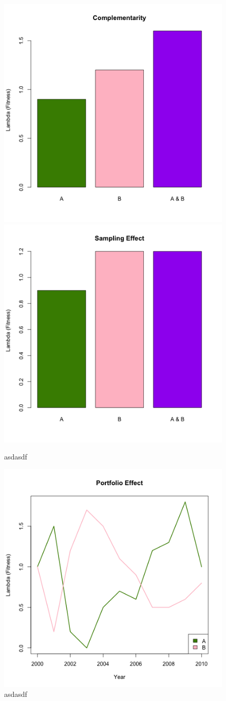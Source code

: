 \documentclass[11pt]{article}\usepackage[sc]{mathpazo} %
\begin{document}
  \begin{figure}[h]
    \includegraphics[width=0.58\linewidth]{Complementarity copy.png}
    \includegraphics[width=0.40\linewidth]{Sampling_Effect copy.png}\caption{asdasdf}\label{fig:comp-samp}
  \end{figure}
  \begin{figure}[h]
    \includegraphics[width=0.60\linewidth]{Portfolio_Effect copy.png}
    \caption{asdasdf}
    \label{fig:portfolio}
  \end{figure}
  
\end{document}
